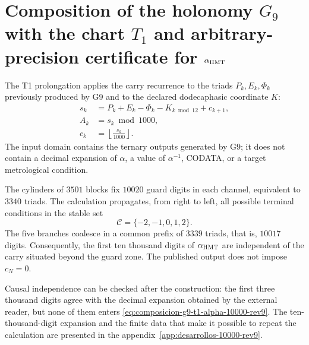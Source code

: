 \section{Composition of the holonomy \(G_9\) with the chart \(T_1\) and arbitrary-precision certificate for \(\alpha_{\rm HMT}\)}
\label{sec:alpha-t1-10000-rev9}

The T1 prolongation applies the carry recurrence to the triads
\(P_k,E_k,\Phi_k\) previously produced by G9 and to the declared
dodecaphasic coordinate \(K\):
\begin{align}
 s_k&=P_k+E_k-\Phi_k-K_{k\bmod12}+c_{k+1},\\
 A_k&=s_k\bmod1000,\\
 c_k&=\left\lfloor\frac{s_k}{1000}\right\rfloor.
 \label{eq:composicion-g9-t1-alpha-10000-rev9}
\end{align}
The input domain contains the ternary outputs generated by G9; it does not
contain a decimal expansion of \(\alpha\), a value of
\(\alpha^{-1}\), CODATA, or a target metrological condition.

The cylinders of \(3501\) blocks fix \(10020\) guard digits in each
channel, equivalent to \(3340\) triads. The calculation propagates, from right to
left, all possible terminal conditions in the stable set
\[
 \mathcal C=\{-2,-1,0,1,2\}.
\]
The five branches coalesce in a common prefix of \(3339\) triads, that is,
\(10017\) digits. Consequently, the first ten thousand digits of
\(\alpha_{\rm HMT}\) are independent of the carry situated beyond the
guard zone. The published output does not impose \(c_N=0\).

Causal independence can be checked after the construction: the first three thousand digits agree with the decimal expansion obtained by the external reader, but none of them enters \eqref{eq:composicion-g9-t1-alpha-10000-rev9}. The ten-thousand-digit expansion and the finite data that make it possible to repeat the calculation are presented in the appendix~\ref{app:desarrollos-10000-rev9}.
